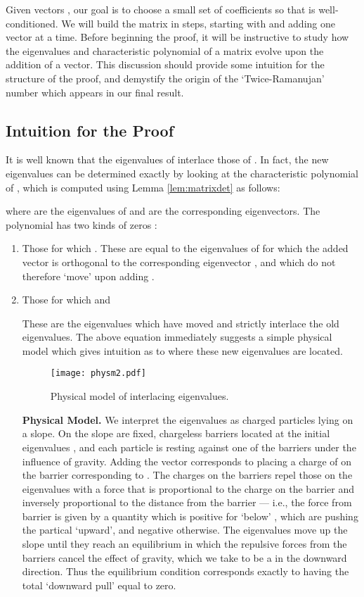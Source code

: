 \documentclass[12pt]{article}
\begin{document}
Given vectors , our goal is to choose a small set of coefficients  so that 
   is well-conditioned. 
We will build the matrix  in steps, starting with  and adding one vector
   at a time. 
Before beginning the proof, it will be instructive to study 
  how the eigenvalues and characteristic polynomial of a matrix evolve upon the addition of a vector.
This discussion should provide some intuition for the structure of the proof, and demystify 
  the origin of the `Twice-Ramanujan' number  which 
  appears in our final result.
\subsection{Intuition for the Proof}
It is well known that the eigenvalues of  interlace those of .
In fact, the new eigenvalues can be determined exactly by looking at the 
  characteristic polynomial of , which is computed using 
  Lemma \ref{lem:matrixdet} as follows:

where  are the eigenvalues of  and  are the corresponding eigenvectors.
The polynomial  has two kinds of zeros :
\begin{enumerate}
\item Those for which . These are equal to the eigenvalues
 of  for
  which the added vector  is orthogonal to the corresponding eigenvector
  , and which do not therefore `move' upon adding .
\item Those for which  and 

  These are the eigenvalues which have moved and strictly interlace the old
    eigenvalues. 
  The above equation immediately suggests a simple physical model which gives
    intuition as to where these new eigenvalues are located. 
  \begin{figure}[htp]\label{fig:phys}
  \centering
  \texttt{[image: physm2.pdf]}
  \caption{Physical model of interlacing eigenvalues.}
  \end{figure}

  \noindent \textbf{Physical Model.} We interpret the eigenvalues  as charged particles lying on a slope.
  On the slope are  fixed, chargeless barriers located at the initial
    eigenvalues , and each particle is resting against one of the
    barriers under the influence of gravity.
  Adding the vector  corresponds to placing a charge of  on the barrier corresponding to .
  The charges on the barriers repel those on the eigenvalues with a force
    that is proportional to the charge on the barrier and inversely proportional
    to the distance from the barrier --- i.e., the force from barrier  is given
    by 
    a quantity which is positive for  `below' , which are
    pushing the partical `upward', and negative otherwise.
  The eigenvalues move up the slope until they reach an equilibrium in which
    the repulsive forces from the barriers cancel the effect of gravity, which
    we take to be a  in the downward direction.
  Thus the equilibrium condition corresponds exactly to having the total
  `downward pull'  equal to zero.
\end{enumerate}
\end{document}
